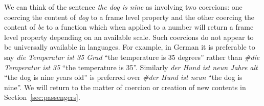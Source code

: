 We can think of the sentence \textit{the dog is nine} as involving two
coercions:  one coercing the content of \textit{dog} to a frame level
property and the other coercing the  content of \textit{be} to a
function which when applied to a number will return a frame level
property depending on an available scale.  Such coercions do not appear to be
universally available in languages.  For example, in German it is
preferable to say \textit{die Temperatur ist 35 Grad} ``the
temperature is 35 degrees'' rather than \textit{\#die Temperatur ist
  35} ``the temperature is 35''.  Similarly \textit{der Hund ist neun
  Jahre alt} ``the dog is nine years old'' is preferred over
\textit{\#der Hund ist neun} ``the dog is nine''.  We will return to
the matter of coercion or creation of new contents in Section~\ref{sec:passengers}.    



 
 


 
   
  
